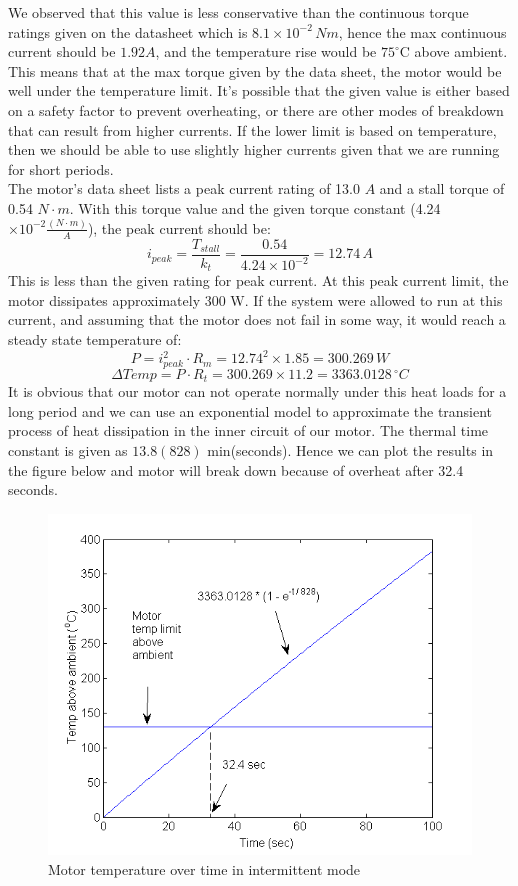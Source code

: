 \documentclass[letterpaper]{article}
\begin{document}
We observed that this value is less conservative than the continuous torque ratings given on the datasheet which is $8.1 \times 10^{-2}\, Nm$, hence the max continuous current should be $1.92 A$, and the temperature rise would be $75^\circ$C above ambient. This means that at the max torque given by the data sheet, the motor would be well under the temperature limit. It's possible that the given value is either based on a safety factor to prevent overheating, or there are other modes of breakdown that can result from higher currents. If the lower limit is based on temperature, then we should be able to use slightly higher currents given that we are running for short periods.\\
The motor's data sheet lists a peak current rating of 13.0 $A$ and a stall torque of 0.54 $N \cdot m$. With this torque value and the given torque constant (4.24$\times 10^{-2} \tfrac{(N \cdot m)}{A}$), the peak current should be:
$$i_{peak} = \dfrac{T_{stall}}{k_{t}} = \dfrac{0.54}{4.24\times 10^{-2}} = 12.74 \,A$$
This is less than the given rating for peak current. At this peak current limit, the motor dissipates approximately 300 W.  If the system were allowed to run at this current, and assuming that the motor does not fail in some way, it would reach a steady state temperature of:
$$P = i_{peak}^2 \cdot R_{m} = 12.74^2 \times 1.85 = 300.269 \,W$$
$$\Delta Temp = P \cdot R_{t} = 300.269 \times 11.2 = 3363.0128  \,{^\circ}C$$ 
It is obvious that our motor can not operate normally under this heat loads for a long period and we can use an exponential model to approximate the transient process of heat dissipation in the inner circuit of our motor. The thermal time constant is given as $13.8(828)$ min(seconds). Hence we can plot the results in the figure below and motor will break down because of overheat after 32.4 seconds.
\begin{figure}[H]
	\centering
	\includegraphics[scale=0.5]{temperature.png}
	\caption{Motor temperature over time in intermittent mode}
\end{figure}
\end{document}
